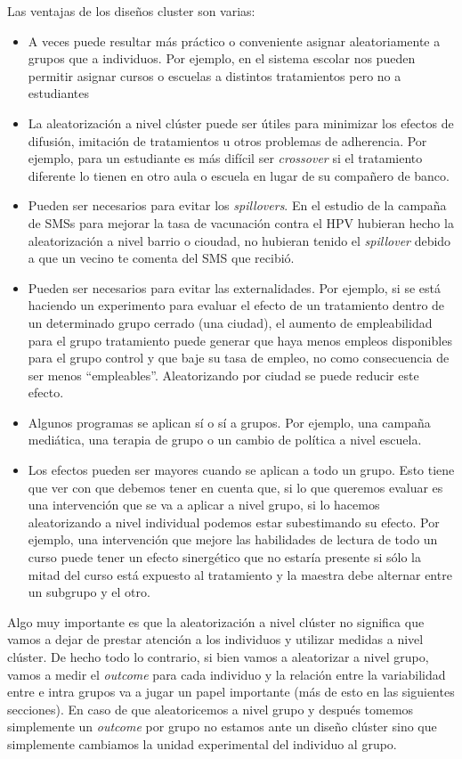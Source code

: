 \documentclass[
  letterpaper,
  DIV=11,
  numbers=noendperiod,
  oneside]{scrreprt}
\begin{document}
Las ventajas de los diseños cluster son varias:

\begin{itemize}
\item
  A veces puede resultar más práctico o conveniente asignar
  aleatoriamente a grupos que a individuos. Por ejemplo, en el sistema
  escolar nos pueden permitir asignar cursos o escuelas a distintos
  tratamientos pero no a estudiantes
\item
  La aleatorización a nivel clúster puede ser útiles para minimizar los
  efectos de difusión, imitación de tratamientos u otros problemas de
  adherencia. Por ejemplo, para un estudiante es más difícil ser
  \emph{crossover} si el tratamiento diferente lo tienen en otro aula o
  escuela en lugar de su compañero de banco.
\item
  Pueden ser necesarios para evitar los \emph{spillovers}. En el estudio
  de la campaña de SMSs para mejorar la tasa de vacunación contra el HPV
  hubieran hecho la aleatorización a nivel barrio o cioudad, no hubieran
  tenido el \emph{spillover} debido a que un vecino te comenta del SMS
  que recibió.
\item
  Pueden ser necesarios para evitar las externalidades. Por ejemplo, si
  se está haciendo un experimento para evaluar el efecto de un
  tratamiento dentro de un determinado grupo cerrado (una ciudad), el
  aumento de empleabilidad para el grupo tratamiento puede generar que
  haya menos empleos disponibles para el grupo control y que baje su
  tasa de empleo, no como consecuencia de ser menos ``empleables''.
  Aleatorizando por ciudad se puede reducir este efecto.
\item
  Algunos programas se aplican sí o sí a grupos. Por ejemplo, una
  campaña mediática, una terapia de grupo o un cambio de política a
  nivel escuela.
\item
  Los efectos pueden ser mayores cuando se aplican a todo un grupo. Esto
  tiene que ver con que debemos tener en cuenta que, si lo que queremos
  evaluar es una intervención que se va a aplicar a nivel grupo, si lo
  hacemos aleatorizando a nivel individual podemos estar subestimando su
  efecto. Por ejemplo, una intervención que mejore las habilidades de
  lectura de todo un curso puede tener un efecto sinergético que no
  estaría presente si sólo la mitad del curso está expuesto al
  tratamiento y la maestra debe alternar entre un subgrupo y el otro.
\end{itemize}

Algo muy importante es que la aleatorización a nivel clúster no
significa que vamos a dejar de prestar atención a los individuos y
utilizar medidas a nivel clúster. De hecho todo lo contrario, si bien
vamos a aleatorizar a nivel grupo, vamos a medir el \emph{outcome} para
cada individuo y la relación entre la variabilidad entre e intra grupos
va a jugar un papel importante (más de esto en las siguientes
secciones). En caso de que aleatoricemos a nivel grupo y después tomemos
simplemente un \emph{outcome} por grupo no estamos ante un diseño
clúster sino que simplemente cambiamos la unidad experimental del
individuo al grupo.
\end{document}

